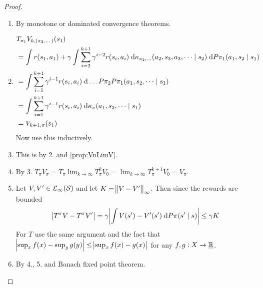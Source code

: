 \begin{proof}
  \leavevmode
  \begin{enumerate}
    \item By monotone or dominated convergence theorems.
      \label{commLimits}
    \item 
      \begin{align*}
	&T_{\pi_1} V_{k,(\pi_2, \dots)}(s_1)
	\\ &= \int r(s_1, a_1) + \gamma
	\int \sum_{i=2}^{k+1} \gamma^{i-2} r(s_i, a_i)
	\; \mathrm{d} \kappa_{\pi_2, \dots} (a_2, s_3, a_3, \dots \mid s_2)
	\; \mathrm{d} P \pi_1(a_1, s_2 \mid s_1)
	\\ &= \int \sum_{i=1}^{k+1} \gamma^{i-1} r(s_i, a_i)
	\; \mathrm{d} \dots P \pi_2 P \pi_1 (a_1, s_2, \dots \mid s_1)
	\\ &= \int \sum_{i=1}^{k+1} \gamma^{i-1} r(s_i, a_i)
	\; \mathrm{d} \kappa_\pi (a_1, s_2, \dots \mid s_1)
	\\ &= V_{k+1, \pi}(s_1)
      \end{align*}
      Now use this inductively.
    \item This is by 2. and \cref{prop:VnLimV}.
    \item By 3. $T_\pi V_\pi = T_\pi \lim_{k \to\infty} T_{\pi}^k V_0
      = \lim_{k \to\infty} T_\pi^{k+1} V_0 = V_\pi$.
    \item Let $V, V' \in \mathcal{L}_\infty(\mathcal{S})$
      and let $K = \norm{V - V'}_\infty$.
      Then since the rewards are bounded
      \[ \abs{T^\pi V - T^\pi V'}
	= \gamma \abs{\int V(s') - V'(s') \; \mathrm{d} P\pi(s' \mid s)}
      \leq \gamma K \]
      For $T$ use the same argument and the fact that
      $\abs{\sup_x f(x) - \sup_{y} g(y)} \leq
      \abs{\sup_x f(x) - g(x)}$ for any $f,g : X \to \underline{\mathbb{R}}$.
    \item By 4., 5. and Banach fixed point theorem.
  \end{enumerate}
\end{proof}

